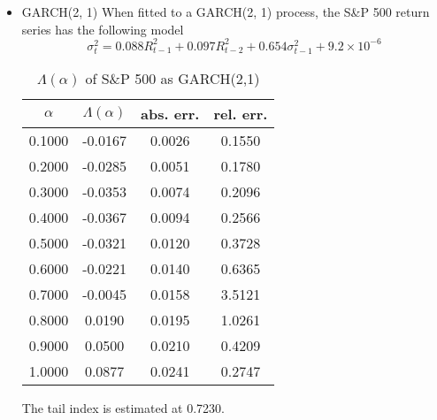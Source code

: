 \documentclass{article}
\theoremstyle{remark}
\begin{document}
\begin{itemize}
\item GARCH(2, 1)
  When fitted to a GARCH(2, 1) process, the S\&P 500 return series has the following model
  \[
  \sigma_t^2 = 0.088 R_{t-1}^2 + 0.097 R_{t-2}^2 + 0.654 \sigma_{t-1}^2 + 9.2 \times 10^{-6}
  \]
  \begin{table}[htb!]
    \centering
    \begin{tabular}{c|c|c|c}
      $\alpha$ & $\Lambda(\alpha)$ & abs. err. & rel. err. \\
      \hline
      0.1000 & -0.0167 & 0.0026 & 0.1550\\
      0.2000 & -0.0285 & 0.0051 & 0.1780\\
      0.3000 & -0.0353 & 0.0074 & 0.2096\\
      0.4000 & -0.0367 & 0.0094 & 0.2566\\
      0.5000 & -0.0321 & 0.0120 & 0.3728\\
      0.6000 & -0.0221 & 0.0140 & 0.6365\\
      0.7000 & -0.0045 & 0.0158 & 3.5121\\
      0.8000 &  0.0190 & 0.0195 & 1.0261\\
      0.9000 &  0.0500 & 0.0210 & 0.4209\\
      1.0000 &  0.0877 & 0.0241 & 0.2747\\
    \end{tabular}
    \caption{$\Lambda(\alpha)$ of S\&P 500 as GARCH(2,1)}
    \label{tab:DAX_garch21_Lambda}
  \end{table}
  The tail index is estimated at 0.7230.
\end{itemize}
\end{document}
